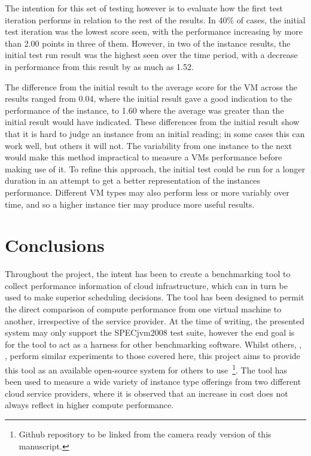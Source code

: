 \documentclass{llncs}
\begin{document}
The intention for this set of testing however is to evaluate how the first test iteration performs in relation to the rest of the results. In 40\% of cases, the initial test iteration was the lowest score seen, with the performance increasing by more than 2.00 points in three of them. However, in two of the instance results, the initial test run result was the highest seen over the time period, with a decrease in performance from this result by as much as 1.52.

The difference from the initial result to the average score for the VM across the results ranged from 0.04, where the initial result gave a good indication to the performance of the instance, to 1.60 where the average was greater than the initial result would have indicated. These differences from the initial result show that it is hard to judge an instance from an initial reading; in some cases this can work well, but others it will not. The variability from one instance to the next would make this method impractical to measure a VMs performance before making use of it. To refine this approach, the initial test could be run for a longer duration in an attempt to get a better representation of the instances performance. Different VM types may also perform less or more variably over time, and so a higher instance tier may produce more useful results.


\section{Conclusions}

Throughout the project, the intent has been to create a benchmarking tool to collect performance information of cloud infrastructure, which can in turn be used to make superior scheduling decisions. The tool has been designed to permit the direct comparison of compute performance from one virtual machine to another, irrespective of the service provider. At the time of writing, the presented system may only support the SPECjvm2008 test suite, however the end goal is for the tool to act as a harness for other benchmarking software. Whilst others, \cite{li2010cloudcmp}, \cite{chhetri2013smart}, perform similar experiments to those covered here, this project aims to provide this tool as an available open-source system for others to use~\footnote{Github repository to be linked from the camera ready version of this manuscript.}. The tool has been used to measure a wide variety of instance type offerings from two different cloud service providers, where it is observed that an increase in cost does not always reflect in higher compute performance.
\end{document}
